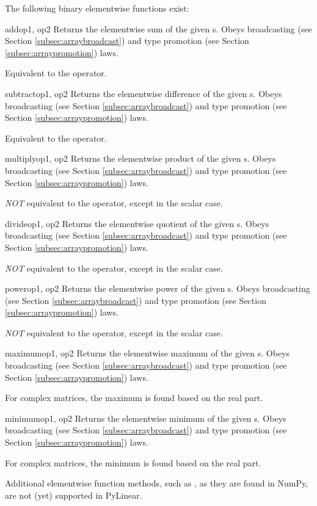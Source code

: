 The following binary elementwise functions exist:

\begin{funcdesc}{add}{op1, op2}
  Returns the elementwise sum of the given s. Obeys
  broadcasting (see Section \ref{subsec:arraybroadcast}) and type
  promotion (see Section \ref{subsec:arraypromotion}) laws.

  Equivalent to the \code{+} operator.
\end{funcdesc}
\begin{funcdesc}{subtract}{op1, op2}
  Returns the elementwise difference of the given s. Obeys
  broadcasting (see Section \ref{subsec:arraybroadcast}) and type
  promotion (see Section \ref{subsec:arraypromotion}) laws.

  Equivalent to the \code{-} operator.
\end{funcdesc}
\begin{funcdesc}{multiply}{op1, op2}
  Returns the elementwise product of the given s. Obeys
  broadcasting (see Section \ref{subsec:arraybroadcast}) and type
  promotion (see Section \ref{subsec:arraypromotion}) laws.

  \emph{NOT} equivalent to the \code{*} operator, except in the scalar
  case.
\end{funcdesc}
\begin{funcdesc}{divide}{op1, op2}
  Returns the elementwise quotient of the given s. Obeys
  broadcasting (see Section \ref{subsec:arraybroadcast}) and type
  promotion (see Section \ref{subsec:arraypromotion}) laws.

  \emph{NOT} equivalent to the \code{/} operator, except in the scalar
  case.
\end{funcdesc}
\begin{funcdesc}{power}{op1, op2}
  Returns the elementwise power  of the given
  s. Obeys broadcasting (see Section
  \ref{subsec:arraybroadcast}) and type promotion (see Section
  \ref{subsec:arraypromotion}) laws.

  \emph{NOT} equivalent to the \code{**} operator, except in the scalar
  case.
\end{funcdesc}
\begin{funcdesc}{maximum}{op1, op2}
  Returns the elementwise maximum of the given
  s. Obeys broadcasting (see Section
  \ref{subsec:arraybroadcast}) and type promotion (see Section
  \ref{subsec:arraypromotion}) laws.

  For complex matrices, the maximum is found based on the real part.
\end{funcdesc}
\begin{funcdesc}{minimum}{op1, op2}
  Returns the elementwise minimum of the given
  s. Obeys broadcasting (see Section
  \ref{subsec:arraybroadcast}) and type promotion (see Section
  \ref{subsec:arraypromotion}) laws.

  For complex matrices, the minimum is found based on the real part.
\end{funcdesc}

Additional elementwise function methods, such as , as they are
found in NumPy, are not (yet) supported in PyLinear.
